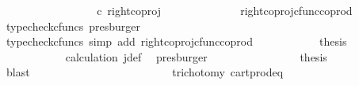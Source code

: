 \begin{isabellebody}
\ \ \ \ \ \ \ \ \isamarkupfalse%
\ \isamarkupfalse%
\ {\isachardoublequoteopen}{\isachardot}{\kern0pt}{\isachardot}{\kern0pt}{\isachardot}{\kern0pt}\ {\isacharequal}{\kern0pt}\ {\isacharparenleft}{\kern0pt}{\isasymlangle}{\isasymt}{\isacharcomma}{\kern0pt}\ {\isasymf}{\isasymrangle}\ {\isasymamalg}{\isasymlangle}{\isasymf}{\isacharcomma}{\kern0pt}\ {\isasymt}{\isasymrangle}{\isacharparenright}{\kern0pt}\ {\isasymcirc}\isactrlsub c\ right{\isacharunderscore}{\kern0pt}coproj\ {\isasymone}\ {\isasymone}{\isachardoublequoteclose}\isanewline
\ \ \ \ \ \ \ \ \ \ \isamarkupfalse%
\ right{\isacharunderscore}{\kern0pt}coproj{\isacharunderscore}{\kern0pt}cfunc{\isacharunderscore}{\kern0pt}coprod\ \isamarkupfalse%
\ {\isacharparenleft}{\kern0pt}typecheck{\isacharunderscore}{\kern0pt}cfuncs{\isacharcomma}{\kern0pt}\ presburger{\isacharparenright}{\kern0pt}\isanewline
\ \ \ \ \ \ \ \ \isamarkupfalse%
\ \isamarkupfalse%
\ {\isachardoublequoteopen}{\isachardot}{\kern0pt}{\isachardot}{\kern0pt}{\isachardot}{\kern0pt}\ {\isacharequal}{\kern0pt}\ {\isasymlangle}{\isasymf}{\isacharcomma}{\kern0pt}\ {\isasymt}{\isasymrangle}{\isachardoublequoteclose}\isanewline
\ \ \ \ \ \ \ \ \ \ \isamarkupfalse%
\ {\isacharparenleft}{\kern0pt}typecheck{\isacharunderscore}{\kern0pt}cfuncs{\isacharcomma}{\kern0pt}\ simp\ add{\isacharcolon}{\kern0pt}\ right{\isacharunderscore}{\kern0pt}coproj{\isacharunderscore}{\kern0pt}cfunc{\isacharunderscore}{\kern0pt}coprod{\isacharparenright}{\kern0pt}\isanewline
\ \ \ \ \ \ \ \ \isamarkupfalse%
\ \isamarkupfalse%
\ {\isacharquery}{\kern0pt}thesis\isanewline
\ \ \ \ \ \ \ \ \ \ \isamarkupfalse%
\ calculation\ j{\isacharunderscore}{\kern0pt}def\ \isamarkupfalse%
\ presburger\isanewline
\ \ \ \ \ \ \isamarkupfalse%
\isanewline
\ \ \ \ \ \ \isamarkupfalse%
\ \isamarkupfalse%
\ {\isacharquery}{\kern0pt}thesis\isanewline
\ \ \ \ \ \ \ \ \isamarkupfalse%
\ blast\isanewline
\ \ \ \ \isamarkupfalse%
\isanewline
\ \ \isamarkupfalse%
\isanewline
\ \ \ \ \isamarkupfalse%
\ \isamarkupfalse%
\ {\isachardoublequoteopen}{\isasymt}\ {\isacharequal}{\kern0pt}\ {\isasymf}{\isachardoublequoteclose}\isanewline
\ \ \ \ \ \ \isamarkupfalse%
\ trichotomy\ cart{\isacharunderscore}{\kern0pt}prod{\isacharunderscore}{\kern0pt}eq{}\ \isamarkupfalse%

\end{isabellebody}
